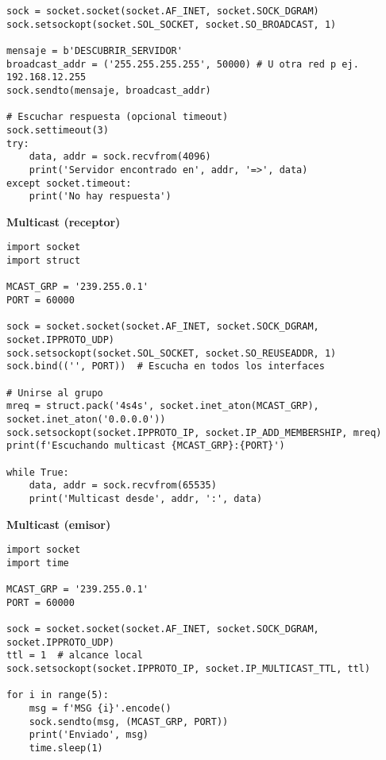 \documentclass[12pt]{amsart}
\begin{document}
\begin{enumerate}
\begin{lstlisting}
sock = socket.socket(socket.AF_INET, socket.SOCK_DGRAM)
sock.setsockopt(socket.SOL_SOCKET, socket.SO_BROADCAST, 1)

mensaje = b'DESCUBRIR_SERVIDOR'
broadcast_addr = ('255.255.255.255', 50000) # U otra red p ej. 192.168.12.255
sock.sendto(mensaje, broadcast_addr)

# Escuchar respuesta (opcional timeout)
sock.settimeout(3)
try:
	data, addr = sock.recvfrom(4096)
	print('Servidor encontrado en', addr, '=>', data)
except socket.timeout:
	print('No hay respuesta')
		\end{lstlisting}

		\medskip \medskip

		\noindent \textbf{Multicast (receptor)}
		\medskip \medskip
		\begin{lstlisting}
import socket
import struct

MCAST_GRP = '239.255.0.1'
PORT = 60000

sock = socket.socket(socket.AF_INET, socket.SOCK_DGRAM, socket.IPPROTO_UDP)
sock.setsockopt(socket.SOL_SOCKET, socket.SO_REUSEADDR, 1)
sock.bind(('', PORT))  # Escucha en todos los interfaces

# Unirse al grupo
mreq = struct.pack('4s4s', socket.inet_aton(MCAST_GRP), socket.inet_aton('0.0.0.0'))
sock.setsockopt(socket.IPPROTO_IP, socket.IP_ADD_MEMBERSHIP, mreq)
print(f'Escuchando multicast {MCAST_GRP}:{PORT}')

while True:
	data, addr = sock.recvfrom(65535)
	print('Multicast desde', addr, ':', data)
		\end{lstlisting}

		\medskip \medskip

		\noindent\textbf{Multicast (emisor)}
		\medskip \medskip
		\begin{lstlisting}
import socket
import time

MCAST_GRP = '239.255.0.1'
PORT = 60000

sock = socket.socket(socket.AF_INET, socket.SOCK_DGRAM, socket.IPPROTO_UDP)
ttl = 1  # alcance local
sock.setsockopt(socket.IPPROTO_IP, socket.IP_MULTICAST_TTL, ttl)

for i in range(5):
	msg = f'MSG {i}'.encode()
	sock.sendto(msg, (MCAST_GRP, PORT))
	print('Enviado', msg)
	time.sleep(1)
		\end{lstlisting}

		\bigskip \bigskip


\end{enumerate}
\end{document}
